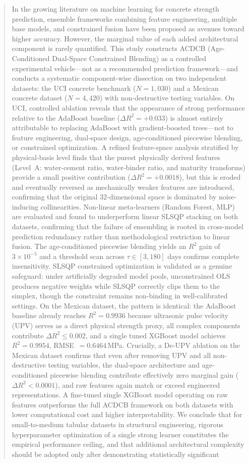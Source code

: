 \documentclass[journal]{IEEEtran}
\begin{document}
\begin{abstract}
In the growing literature on machine learning for concrete strength prediction, ensemble frameworks combining feature engineering, multiple base models, and constrained fusion have been proposed as avenues toward higher accuracy. However, the marginal value of each added architectural component is rarely quantified. This study constructs ACDCB (Age-Conditioned Dual-Space Constrained Blending) as a controlled experimental vehicle---not as a recommended prediction framework---and conducts a systematic component-wise dissection on two independent datasets: the UCI concrete benchmark ($N = 1{,}030$) and a Mexican concrete dataset ($N = 4{,}420$) with non-destructive testing variables. On UCI, controlled ablation reveals that the appearance of strong performance relative to the AdaBoost baseline ($\Delta R^2 = +0.033$) is almost entirely attributable to replacing AdaBoost with gradient-boosted trees---not to feature engineering, dual-space design, age-conditioned piecewise blending, or constrained optimization. A refined feature-space analysis stratified by physical-basis level finds that the purest physically derived features (Level~A: water-cement ratio, water-binder ratio, and maturity transforms) provide a small positive contribution ($\Delta R^2 = +0.0018$), but this is eroded and eventually reversed as mechanically weaker features are introduced, confirming that the original 32-dimensional space is dominated by noise-inducing collinearities. Non-linear meta-learners (Random Forest, MLP) are evaluated and found to underperform linear SLSQP stacking on both datasets, confirming that the failure of ensembling is rooted in cross-model prediction redundancy rather than methodological restriction to linear fusion. The age-conditioned piecewise blending yields an $R^2$ gain of $3 \times 10^{-5}$ and a threshold scan across $\tau \in [3, 180]$ days confirms complete insensitivity. SLSQP constrained optimization is validated as a genuine safeguard: under artificially degraded model pools, unconstrained OLS produces negative weights while SLSQP correctly clips them to the simplex, though the constraint remains non-binding in well-calibrated settings. On the Mexican dataset, the pattern is identical: the AdaBoost baseline already reaches $R^2 = 0.9936$ because ultrasonic pulse velocity (UPV) serves as a direct physical strength proxy, all complex components contribute $\Delta R^2 \leq 0.002$, and a single tuned XGBoost model achieves $R^2 = 0.9954$, RMSE~$= 0.6464$\,MPa. Crucially, a De-UPV ablation on the Mexican dataset confirms that even after removing UPV and all non-destructive testing variables, the dual-space architecture and age-conditioned piecewise blending contribute effectively zero marginal gain ($\Delta R^2 < 0.0001$), and raw features again match or exceed engineered representations. A fine-tuned single XGBoost model operating on raw features outperforms the full ACDCB framework on both datasets with lower computational cost and higher interpretability. We conclude that for small-to-medium tabular datasets in structural engineering, rigorous hyperparameter optimization of a single strong learner constitutes the empirical performance ceiling, and that additional architectural complexity should be adopted only after demonstrating statistically significant 
\end{abstract}
\end{document}
